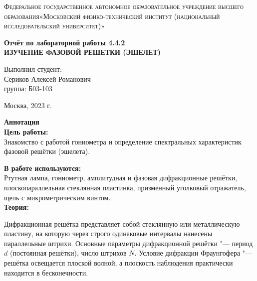 \documentclass[a4paper, 12pt]{article}%
\begin{document}
	\begin{titlepage}
		\begin{center}
			\textsc{Федеральное государственное автономное образовательное учреждение высшего образования«Московский физико-технический институт (национальный исследовательский университет)»\\[5mm]
			}
			
			\vfill
			
			\textbf{Отчёт по лабораторной работы 4.4.2 \\[3mm]
				ИЗУЧЕНИЕ ФАЗОВОЙ РЕШЕТКИ (ЭШЕЛЕТ)
				\\[50mm]
			}
			
		\end{center}
		
		\hfill
		\begin{minipage}{.5\textwidth}
			Выполнил студент:\\[2mm]
			Сериков Алексей Романович\\[2mm]
			группа: Б03-103\\[5mm]
			
		\end{minipage}
		\vfill
		\begin{center}
			Москва, 2023 г.
		\end{center}
		
	\end{titlepage}
	
	\newpage
	\textbf{Аннотация}\\
	
	
	\textbf{Цель работы: }\\
	
	Знакомство с работой гониометра и определение спектральных характеристик фазовой решётки (эшелета).
	
	\textbf{В работе используются: }\\
	
	Ртутная лампа, гониометр, амплитудная и фазовая дифракционные решётки, плоскопараллельная стеклянная пластинка, призменный уголковый отражатель, щель с микрометрическим винтом.
	\\
	
	
	
	\textbf{Теория:}
	
	
Дифракционная решётка представляет собой стеклянную или металлическую пластину, на которую через строго одинаковые интервалы нанесены параллельные штрихи. Основные параметры дифракционной решётки "--- период $d$ (постоянная решётки), число штрихов $N$.
Условие дифракции Фраунгофера "--- решётка освещается плоской волной, а плоскость наблюдения практически находится в бесконечности.
\end{document}
